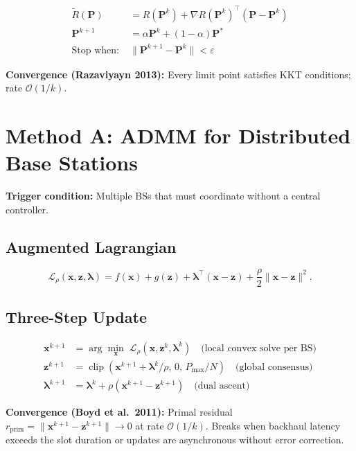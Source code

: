 \documentclass[conference]{IEEEtran}
\begin{document}
\begin{align}
\tilde{R}(\mathbf{P}) &= R(\mathbf{P}^k) + \nabla R(\mathbf{P}^k)^\top(\mathbf{P}-\mathbf{P}^k)\\
\mathbf{P}^{k+1}     &= \alpha\mathbf{P}^k + (1-\alpha)\mathbf{P}^* \\
\text{Stop when:}\;&\|\mathbf{P}^{k+1} - \mathbf{P}^k\| < \varepsilon
\end{align}

\textbf{Convergence (Razaviyayn 2013):} Every limit point satisfies KKT conditions; rate $\mathcal{O}(1/k)$.

\section{Method A: ADMM for Distributed Base Stations}
\label{sec:admm}

\textbf{Trigger condition:} Multiple BSs that must coordinate without a central controller.

\subsection{Augmented Lagrangian}

\begin{equation}
\mathcal{L}_\rho(\mathbf{x},\mathbf{z},\boldsymbol{\lambda})
= f(\mathbf{x}) + g(\mathbf{z})
  + \boldsymbol{\lambda}^\top(\mathbf{x}-\mathbf{z})
  + \frac{\rho}{2}\|\mathbf{x}-\mathbf{z}\|^2.
\end{equation}

\subsection{Three-Step Update}
\begin{align}
\mathbf{x}^{k+1} &= \arg\min_{\mathbf{x}}\;\mathcal{L}_\rho(\mathbf{x},\mathbf{z}^k,\boldsymbol{\lambda}^k)
  \quad\text{(local convex solve per BS)}\label{eq:admm_x}\\
\mathbf{z}^{k+1} &= \operatorname{clip}\!\left(\mathbf{x}^{k+1} + \boldsymbol{\lambda}^k/\rho,\,0,\,P_{\max}/N\right)
  \quad\text{(global consensus)}\label{eq:admm_z}\\
\boldsymbol{\lambda}^{k+1} &= \boldsymbol{\lambda}^k + \rho(\mathbf{x}^{k+1} - \mathbf{z}^{k+1})
  \quad\text{(dual ascent)}\label{eq:admm_lam}
\end{align}

\textbf{Convergence (Boyd et al.\ 2011):} Primal residual $r_{\text{prim}} = \|\mathbf{x}^{k+1}-\mathbf{z}^{k+1}\|\to 0$ at rate $\mathcal{O}(1/k)$.
Breaks when backhaul latency exceeds the slot duration or updates are asynchronous without error correction.
\end{document}
